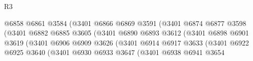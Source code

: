 \begin{lexlean}{R3}
\begin{coremodule}
                                              @6858
                                              @6861
                                              @3584
                                              (@3401
                                                @6866
                                                @6869
                                                @3591
                                                (@3401
                                                  @6874
                                                  @6877
                                                  @3598
                                                  (@3401
                                                    @6882
                                                    @6885
                                                    @3605
                                                    (@3401
                                                      @6890
                                                      @6893
                                                      @3612
                                                      (@3401
                                                        @6898
                                                        @6901
                                                        @3619
                                                        (@3401
                                                          @6906
                                                          @6909
                                                          @3626
                                                          (@3401
                                                            @6914
                                                            @6917
                                                            @3633
                                                            (@3401
                                                              @6922
                                                              @6925
                                                              @3640
                                                              (@3401
                                                                @6930
                                                                @6933
                                                                @3647
                                                                (@3401
                                                                  @6938
                                                                  @6941
                                                                  @3654

\end{coremodule}
\end{lexlean}
